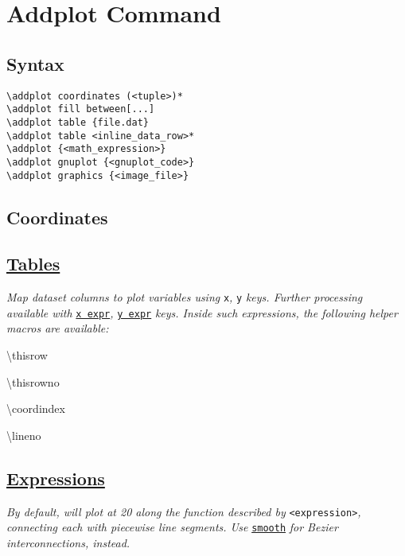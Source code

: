\section{Addplot Command}

\subsection*{Syntax}
\begin{lstlisting}
\addplot coordinates (<tuple>)*
\addplot fill between[...]
\addplot table {file.dat}
\addplot table <inline_data_row>*
\addplot {<math_expression>}
\addplot gnuplot {<gnuplot_code>}
\addplot graphics {<image_file>}
\end{lstlisting}



\subsection*{Coordinates}




\subsection*{\href{\docurl\#pgfp.table}{Tables}}

\textit{Map dataset columns to plot variables using }\texttt{\color{blue}x}\textit{, }\texttt{\color{blue}y}\textit{ keys. Further processing available with }\href{\docurl\#pgfp./pgfplots/table/x}{\texttt{\color{blue}x expr}}\textit{, }\href{\docurl\#pgfp./pgfplots/table/y}{\texttt{\color{blue}y expr}}\textit{ keys. Inside such expressions, the following helper macros are available:}
\begin{minipage}{1.3cm}
\textbackslash thisrow
\end{minipage}
\begin{minipage}{1.7cm}
\textbackslash thisrowno
\end{minipage}
\begin{minipage}{1.8cm}
\textbackslash coordindex
\end{minipage}
\begin{minipage}{1.3cm}
\textbackslash lineno
\end{minipage}



\subsection*{\href{\docurl\#pgfp.expression}{Expressions}}
\textit{By default, will plot  at 20  along the function described by }\texttt{<expression>}\textit{, connecting each with piecewise line segments. Use }\href{\docurl\#pgfp./tikz/smooth}{\texttt{\color{blue}smooth}}\textit{ for Bezier interconnections, instead.}\\
\\
\\

